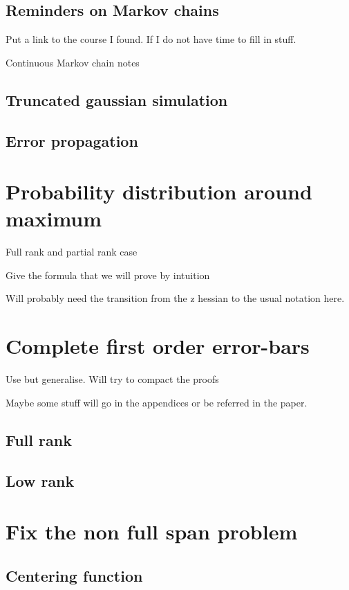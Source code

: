 \documentclass[10pt]{report}
\theoremstyle{plain}
\theoremstyle{definition}
\theoremstyle{remark}
\begin{document}
\subsection{Reminders on Markov chains}

Put a link to the course I found. If I do not have time to fill in stuff.

Continuous Markov chain notes

\subsection{Truncated gaussian simulation}

\subsection{Error propagation}

\section{Probability distribution around maximum}

Full rank and partial rank case

Give the formula that we will prove by intuition

Will probably need the transition from the z hessian to the usual notation here.

\section{Complete first order error-bars}

Use \cite{SPRAL17} but generalise. Will try to compact the proofs

Maybe some stuff will go in the appendices or be referred in the paper.
\subsection{Full rank}

\subsection{Low rank}

\section{Fix the non full span problem}\label{sec:fixspan}

\subsection{Centering function}
\end{document}

